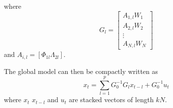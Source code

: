 \documentclass[preprint, 11pt]{elsarticle}
\newcommand{\?}{\stackrel{?}{=}}
\begin{document}
where
\begin{equation}
  \label{eq:5}
  G_{l} =
  \begin{bmatrix}
    A_{1,l}W_{1}\\ A_{2,l}W_{2}\\ \vdots \\A_{N,l}W_{N}
  \end{bmatrix}
\end{equation}
and $A_{i,l} = [\Phi_{1l}  \Lambda_{2l}]$.

The global model can then be compactly written as
\begin{equation}
  \label{eq:6}
  x_{t} = \sum_{l=1}^{p}G_{0}^{-1}G_{l }x_{t-l} + G_{0}^{-1}u_{t}
\end{equation}
where $x_{t}$ $x_{t-l}$ and $u_{t}$ are stacked vectors of length $kN$.





\end{document}
